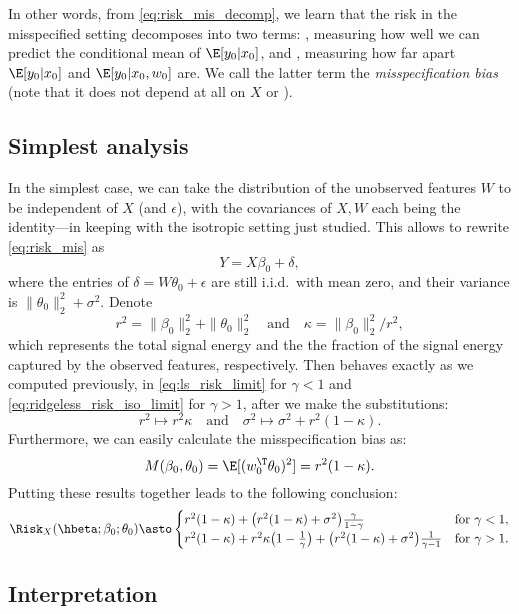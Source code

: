 \documentclass{article}
\begin{document}
In other words, from \eqref{eq:risk_mis_decomp}, we learn that the risk in the
misspecified setting decomposes into two terms: , measuring how well we can predict the conditional mean of
$\E[y_0|x_0]$, and , measuring how far
apart $\E[y_0|x_0]$ and $\E[y_0|x_0,w_0]$ are. We call the latter term the
\emph{misspecification bias} (note that it does not depend at all on $X$ or
\smash{$\hbeta$}).   

\subsection{Simplest analysis}

In the simplest case, we can take the distribution of the unobserved features
$W$ to be independent of $X$ (and $\epsilon$), with the covariances of $X,W$
each being the identity---in keeping with the isotropic setting just
studied. This allows to rewrite \eqref{eq:risk_mis} as 
\[
Y = X\beta_0 + \delta,
\]
where the entries of $\delta = W\theta_0 + \epsilon$ are still i.i.d.\ with mean
zero, and their variance is $\|\theta_0\|_2^2 + \sigma^2$. Denote 
\[
r^2=\|\beta_0\|_2^2+\|\theta_0\|_2^2 \quad \text{and} \quad 
\kappa=\|\beta_0\|_2^2 / r^2,
\]
which represents the total signal energy and the the fraction of the signal
energy captured by the observed features, respectively. Then  behaves exactly as we computed previously, in
\eqref{eq:ls_risk_limit} for $\gamma<1$ and \eqref{eq:ridgeless_risk_iso_limit}
for $\gamma>1$, after we make the substitutions:     
\[
r^2 \mapsto r^2 \kappa \quad \text{and} \quad
\sigma^2 \mapsto \sigma^2 + r^2 (1-\kappa).
\]
Furthermore, we can easily calculate the misspecification bias as: 
\[
M(\beta_0, \theta_0) = \E[(w_0^\T \theta_0)^2] = r^2 (1-\kappa). 
\]
Putting these results together leads to the following conclusion:
\begin{equation}
\label{eq:ridgeless_risk_iso_mis_limit}
\Risk_X(\hbeta; \beta_0; \theta_0) \asto 
\begin{cases}
r^2(1-\kappa) + \big(r^2(1-\kappa) + \sigma^2\big) 
\frac{\gamma}{1-\gamma} & \text{for $\gamma < 1$}, \\
r^2(1-\kappa) + r^2 \kappa \big(1-\frac{1}{\gamma}\big) 
+ \big(r^2(1-\kappa) + \sigma^2\big) \frac{1}{\gamma-1} &  
\text{for $\gamma > 1$}.
\end{cases}
\end{equation}

\subsection{Interpretation}
\end{document}
